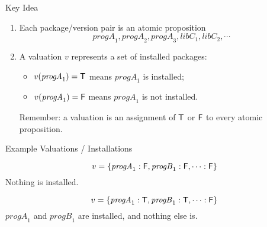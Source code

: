 \documentclass[xetex,aspectratio=169,14pt,hyperref={pdfpagelabels=true,pdflang={en-GB}}]{beamer}
\begin{document}


\begin{frame}
  {Key Idea}

  \begin{enumerate}
  \item Each package/version pair is an atomic proposition
    \begin{displaymath}
      \mathit{progA}_1, \mathit{progA}_2, \mathit{progA}_3, \mathit{libC}_1, \mathit{libC}_2, \cdots
    \end{displaymath}
  \item A valuation $v$ represents a set of installed
    packages:
    \begin{itemize}
    \item $v(\mathit{progA}_1) = \mathsf{T}$ means $\mathit{progA}_1$ is installed;
    \item $v(\mathit{progA}_1) = \mathsf{F}$ means $\mathit{progA}_1$ is not installed.
    \end{itemize}
    {\footnotesize \textcolor{black!60}{Remember: a valuation is an assignment of
      $\mathsf{T}$ or $\mathsf{F}$ to every atomic proposition.}}
  \end{enumerate}

\end{frame}

\begin{frame}
  {Example Valuations / Installations}

  \begin{displaymath}
    v = \{ \mathit{progA}_1 : \mathsf{F}, \mathit{progB}_1 : \mathsf{F}, \cdots : \mathsf{F} \}
  \end{displaymath}
  \raggedleft
  {\footnotesize Nothing is installed.}

  \raggedright

  \pause
  \begin{displaymath}
    v = \{ \mathit{progA}_1 : \mathsf{T}, \mathit{progB}_1 : \mathsf{T}, \cdots : \mathsf{F} \}
  \end{displaymath}
  \raggedleft
  {\footnotesize $\mathit{progA}_1$ and $\mathit{progB}_1$ are
    installed, and nothing else is.}

  \raggedright

\end{frame}
\end{document}
